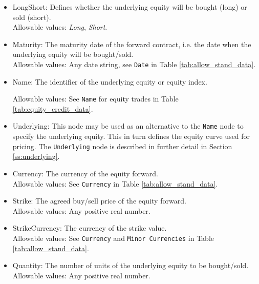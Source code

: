 \begin{itemize}
	\item LongShort: Defines whether the underlying equity will be bought (long) or sold (short). \\
	Allowable values:  \emph{Long}, \emph{Short}.
	\item Maturity: The maturity date of the forward contract, i.e. the date when the underlying equity will be bought/sold. \\
	Allowable values: Any date string, see \lstinline!Date! in Table \ref{tab:allow_stand_data}.
	\item Name: The identifier of the underlying equity or equity index. 
	
	Allowable values:  See \lstinline!Name! for equity trades in Table \ref{tab:equity_credit_data}. \\
	\item Underlying:  This node may be used as an alternative to the \lstinline!Name! node to specify the underlying equity. This in turn defines the equity curve used for pricing. The \lstinline!Underlying! node is described in further detail in Section \ref{ss:underlying}. \\
	\item Currency: The  currency of the equity forward. \\
	Allowable values:  See \lstinline!Currency! in Table \ref{tab:allow_stand_data}.	
	\item Strike: The agreed buy/sell price of the equity forward. \\
	Allowable values:  Any positive real number.	
	\item StrikeCurrency: The currency of the strike value. \\
	Allowable values:  See \lstinline!Currency! and \lstinline!Minor Currencies! in Table \ref{tab:allow_stand_data}.	
	\item Quantity: The number of units of the underlying equity to be bought/sold. \\
	Allowable values:  Any positive real number.
\end{itemize}